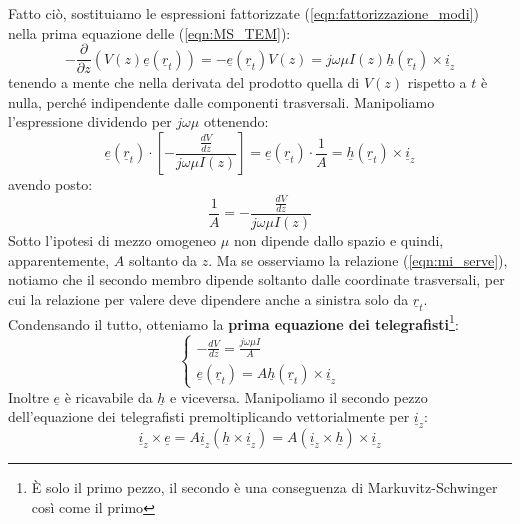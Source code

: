 \documentclass{book}
\begin{document}
    Fatto ciò, sostituiamo le espressioni fattorizzate (\ref{eqn:fattorizzazione_modi}) nella prima equazione delle (\ref{eqn:MS_TEM}):
    \begin{equation}
        -\frac{\partial}{\partial z}(V(z)\underline{e}(\underline{r}_{t})) = - \underline{e}(\underline{r}_{t})V(z) = j \omega \mu I(z)\underline{h}(\underline{r}_{t}) \times \underline{i}_{z}
    \end{equation}
    tenendo a mente che nella derivata del prodotto quella di $V(z)$ rispetto a $t$ è nulla, perché indipendente dalle componenti trasversali.
    Manipoliamo l'espressione dividendo per $j \omega \mu$ ottenendo:
    \begin{equation}
        \label{eqn:mi_serve}
        \underline{e}(\underline{r}_{t}) \cdot [-\frac{\displaystyle \frac{dV}{dz}}{j \omega \mu I(z)}] = \underline{e}(\underline{r}_{t}) \cdot \frac{1}{A}= \underline{h}(\underline{r}_{t}) \times \underline{i}_{z}
    \end{equation}
    avendo posto:
    \begin{equation}
         \frac{1}{A} = -\frac{\displaystyle \frac{dV}{dz}}{j \omega \mu I(z)}
    \end{equation}
    Sotto l'ipotesi di mezzo omogeneo $\mu$ non dipende dallo spazio e quindi, apparentemente, $A$ soltanto da $z$. Ma se osserviamo
    la relazione (\ref{eqn:mi_serve}), notiamo che il secondo membro dipende soltanto dalle coordinate trasversali, per cui la relazione per valere deve 
    dipendere anche a sinistra solo da $\underline{r}_{t}$.
    Condensando il tutto, otteniamo la \textbf{prima equazione dei telegrafisti}\footnote{È solo il primo pezzo, il secondo è una conseguenza di Markuvitz-Schwinger così come il primo}:
    \begin{equation}
        \label{eqn:prima_eq_telegrafisti}
        \begin{cases}
            \displaystyle - \frac{dV}{dz} = \frac{j \omega \mu I}{A} \\
            \underline{e}(\underline{r}_{t}) = A \underline{h}(\underline{r}_{t}) \times \underline{i}_{z}
        \end{cases}
    \end{equation}
    Inoltre $\underline{e}$ è ricavabile da $\underline{h}$ e viceversa. Manipoliamo 
    il secondo pezzo dell'equazione dei telegrafisti premoltiplicando vettorialmente per $\underline{i}_{z}$:
    \begin{equation}
        \underline{i}_{z} \times \underline{e} = A \underline{i}_{z}(\underline{h} \times \underline{i}_{z}) = A (\underline{i}_{z} \times \underline{h}) \times \underline{i}_{z}
    \end{equation}
\end{document}
